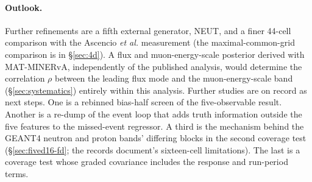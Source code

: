 \paragraph{Outlook.} Further refinements are a fifth external generator, NEUT, and a finer 44-cell comparison with the Ascencio \emph{et al.} measurement (the maximal-common-grid comparison is in \S\ref{sec:4d}). A flux and muon-energy-scale posterior derived with MAT-MINERvA, independently of the published analysis, would determine the correlation $\rho$ between the leading flux mode and the muon-energy-scale band (\S\ref{sec:systematics}) entirely within this analysis. Further studies are on record as next steps. One is a rebinned bias-half screen of the five-observable result. Another is a re-dump of the event loop that adds truth information outside the five features to the missed-event regressor. A third is the mechanism behind the GEANT4 neutron and proton bands' differing blocks in the second coverage test (\S\ref{sec:fived16-fd}; the records document's sixteen-cell limitations). The last is a coverage test whose graded covariance includes the response and run-period terms.

